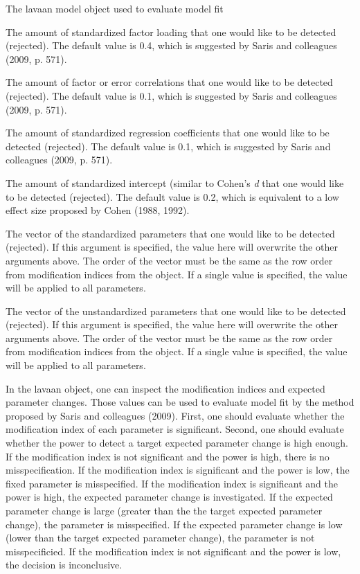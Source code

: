 \documentclass[a4paper]{book}
\begin{document}
\begin{Arguments}
\begin{ldescription}
\item[\code{lavaanObj}] The lavaan model object used to evaluate model fit
\item[\code{stdLoad}] The amount of standardized factor loading that one would like to be detected (rejected). The default value is 0.4, which is suggested by Saris and colleagues (2009, p. 571).
\item[\code{cor}] The amount of factor or error correlations that one would like to be detected (rejected). The default value is 0.1, which is suggested by Saris and colleagues (2009, p. 571).
\item[\code{stdBeta}] The amount of standardized regression coefficients that one would like to be detected (rejected). The default value is 0.1, which is suggested by Saris and colleagues (2009, p. 571).
\item[\code{intcept}] The amount of standardized intercept (similar to Cohen's \emph{d} that one would like to be detected (rejected). The default value is 0.2, which is equivalent to a low effect size proposed by Cohen (1988, 1992).
\item[\code{stdDelta}] The vector of the standardized parameters that one would like to be detected (rejected). If this argument is specified, the value here will overwrite the other arguments above. The order of the vector must be the same as the row order from modification indices from the  object. If a single value is specified, the value will be applied to all parameters.
\item[\code{delta}] The vector of the unstandardized parameters that one would like to be detected (rejected). If this argument is specified, the value here will overwrite the other arguments above. The order of the vector must be the same as the row order from modification indices from the  object. If a single value is specified, the value will be applied to all parameters.
\end{ldescription}
\end{Arguments}
%
\begin{Details}\relax
In the lavaan object, one can inspect the modification indices and expected parameter changes. Those values can be used to evaluate model fit by the method proposed by Saris and colleagues (2009). First, one should evaluate whether the modification index of each parameter is significant. Second, one should evaluate whether the power to detect a target expected parameter change is high enough. If the modification index is not significant and the power is high, there is no misspecification. If the modification index is significant and the power is low, the fixed parameter is misspecified. If the modification index is significant and the power is high, the expected parameter change is investigated. If the expected parameter change is large (greater than the the target expected parameter change), the parameter is misspecified. If the expected parameter change is low (lower than the target expected parameter change), the parameter is not misspecificied. If the modification index is not significant and the power is low, the decision is inconclusive.
\end{Details}
\end{document}
